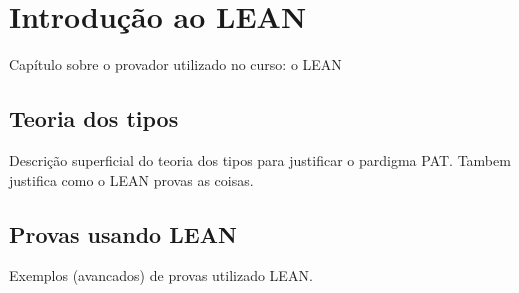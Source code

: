 \chapter{Introdução ao LEAN}
Capítulo sobre o provador utilizado no curso: o LEAN

\section{Teoria dos tipos}
Descrição superficial do teoria dos tipos para justificar o pardigma PAT.
Tambem justifica como o LEAN provas as coisas.

\section{Provas usando LEAN}
Exemplos (avancados) de provas utilizado LEAN.
